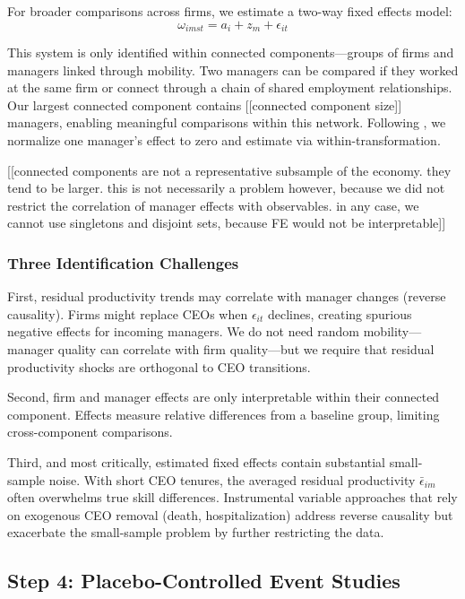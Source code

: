 \documentclass[11pt,a4paper]{article}
\begin{document}
For broader comparisons across firms, we estimate a two-way fixed effects model:
\begin{equation}
\omega_{imst} = a_i + z_m + \epsilon_{it}
\end{equation}

This system is only identified within connected components—groups of firms and managers linked through mobility. Two managers can be compared if they worked at the same firm or connect through a chain of shared employment relationships. Our largest connected component contains [[connected component size]] managers, enabling meaningful comparisons within this network. Following \citet{Abowd1999Econometrica}, we normalize one manager's effect to zero and estimate via within-transformation.

[[connected components are not a representative subsample of the economy. they tend to be larger. this is not necessarily a problem however, because we did not restrict the correlation of manager effects with observables. in any case, we cannot use singletons and disjoint sets, because FE would not be interpretable]]


\subsubsection{Three Identification Challenges}

First, residual productivity trends may correlate with manager changes (reverse causality). Firms might replace CEOs when $\epsilon_{it}$ declines, creating spurious negative effects for incoming managers. We do not need random mobility—manager quality can correlate with firm quality—but we require that residual productivity shocks are orthogonal to CEO transitions.

Second, firm and manager effects are only interpretable within their connected component. Effects measure relative differences from a baseline group, limiting cross-component comparisons.


Third, and most critically, estimated fixed effects contain substantial small-sample noise. With short CEO tenures, the averaged residual productivity $\bar{\epsilon}_{im}$ often overwhelms true skill differences. Instrumental variable approaches that rely on exogenous CEO removal (death, hospitalization) address reverse causality but exacerbate the small-sample problem by further restricting the data.

\subsection{Step 4: Placebo-Controlled Event Studies}
\end{document}
